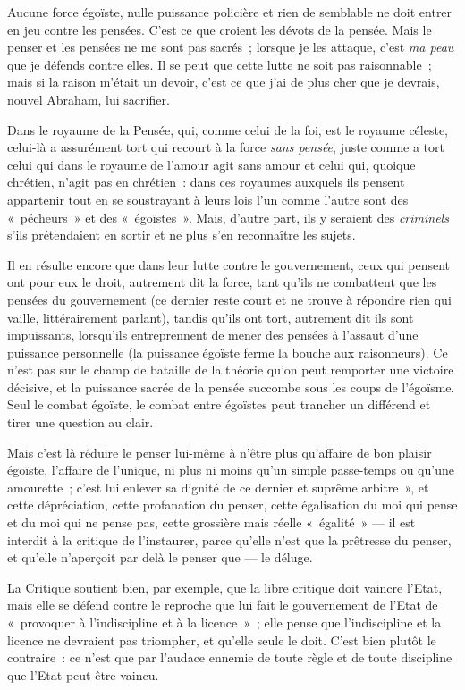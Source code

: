 \documentclass[french,twoside]{book} %
\begin{document}
Aucune force égoïste, nulle puissance policière et rien de semblable ne doit entrer en jeu contre les pensées. C’est ce que croient les dévots de la pensée. Mais le penser et les pensées ne me sont pas sacrés ; lorsque je les attaque, c’est \emph{ma peau} que je défends contre elles. Il se peut que cette lutte ne soit pas raisonnable ; mais si la raison m’était un devoir, c’est ce  que j’ai de plus cher que je devrais, nouvel Abraham, lui sacrifier.\par
Dans le royaume de la Pensée, qui, comme celui de la foi, est le royaume céleste, celui-là a assurément tort qui recourt à la force \emph{sans pensée}, juste comme a tort celui qui dans le royaume de l’amour agit sans amour et celui qui, quoique chrétien, n’agit pas en chrétien : dans ces royaumes auxquels ils pensent appartenir tout en se soustrayant à leurs lois l’un comme l’autre sont des « pécheurs » et des « égoïstes ». Mais, d’autre part, ils y seraient des \emph{criminels} s’ils prétendaient en sortir et ne plus s’en reconnaître les sujets.\par
Il en résulte encore que dans leur lutte contre le gouvernement, ceux qui pensent ont pour eux le droit, autrement dit la force, tant qu’ils ne combattent que les pensées du gouvernement (ce dernier reste court et ne trouve à répondre rien qui vaille, littérairement parlant), tandis qu’ils ont tort, autrement dit ils sont impuissants, lorsqu’ils entreprennent de mener des pensées à l’assaut d’une puissance personnelle (la puissance égoïste ferme la bouche aux raisonneurs). Ce n’est pas sur le champ de bataille de la théorie qu’on peut remporter une victoire décisive, et la puissance sacrée de la pensée succombe sous les coups de l’égoïsme. Seul le combat égoïste, le combat entre égoïstes peut trancher un différend et tirer une question au clair.\par
Mais c’est là réduire le penser lui-même à n’être plus qu’affaire de bon plaisir égoïste, l’affaire de l’unique, ni plus ni moins qu’un simple passe-temps ou qu’une amourette ; c’est lui enlever sa dignité de ce dernier et suprême arbitre », et cette dépréciation, cette profanation du penser, cette égalisation du moi qui pense et du moi qui ne pense pas, cette grossière mais réelle « égalité » — il est interdit à la critique de l’instaurer, parce qu’elle n’est que la prêtresse du penser, et qu’elle n’aperçoit par delà le penser que — le déluge.\par
 La Critique soutient bien, par exemple, que la libre critique doit vaincre l’Etat, mais elle se défend contre le reproche que lui fait le gouvernement de l’Etat de « provoquer à l’indiscipline et à la licence » ; elle pense que l’indiscipline et la licence ne devraient pas triompher, et qu’elle seule le doit. C’est bien plutôt le contraire : ce n’est que par l’audace ennemie de toute règle et de toute discipline que l’Etat peut être vaincu.\par
\end{document}
